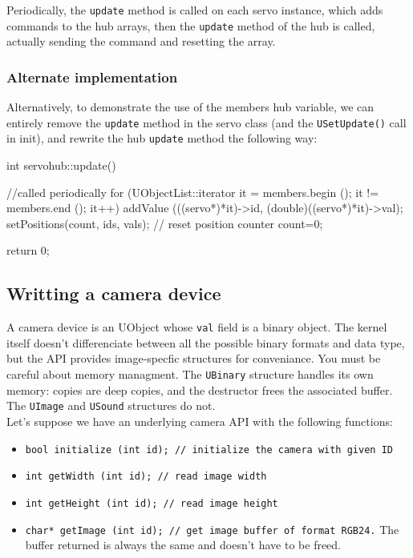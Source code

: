 Periodically, the \lstinline{update} method is called on each servo
instance, which adds commands to the hub arrays, then the
\lstinline{update} method of the hub is called, actually sending the
command and resetting the array.

\subsubsection{Alternate implementation}

Alternatively, to demonstrate the use of the members hub variable, we
can entirely remove the \lstinline{update} method in the servo class
(and the \lstinline{USetUpdate()} call in init), and rewrite the hub
\lstinline{update} method the following way:

\begin{urbiscript}
int servohub::update()
{
  //called periodically
  for (UObjectList::iterator it = members.begin ();
       it != members.end ();
       it++)
  {
    addValue (((servo*)*it)->id,
              (double)((servo*)*it)->val);
  }
  setPositions(count, ids, vals);
  // reset position counter
  count=0;

  return 0;
}
\end{urbiscript}

\subsection{Writting a camera device}

A camera device is an UObject whose \lstinline{val} field is a binary
object. The \urbi kernel itself doesn't differenciate between all the
possible binary formats and data type, but the API provides
image-specfic structures for conveniance. You must be careful about
memory managment. The \lstinline{UBinary} structure handles its own
memory: copies are deep copies, and the destructor frees the
associated buffer. The \lstinline{UImage} and \lstinline{USound}
structures do not.\\

Let's suppose we have an underlying camera API with the following functions:

\begin{itemize}
\item{\lstinline{bool initialize (int id); // initialize the camera with given ID}}
\item{\lstinline{int getWidth (int id); // read image width}}
\item{\lstinline{int getHeight (int id); // read image height}}
\item{\lstinline{char* getImage (int id); // get image buffer of format RGB24.}
  The buffer returned is always the same and doesn't have to be freed.}
\end{itemize}

